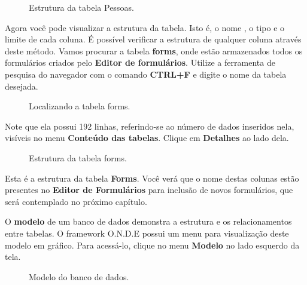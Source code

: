 \documentclass[9pt]{report}
\begin{document}
{    \begin{figure}[H]
     \caption{Estrutura da tabela Pessoas.}
     \label{fig:estruturapessoas}     
    \end{figure}
    
    Agora você pode visualizar a estrutura da tabela. Isto é, o nome
    , o tipo e o limite de cada coluna. É possível verificar a
    estrutura de qualquer coluna através deste método. Vamos procurar
    a tabela  \textbf{forms}, onde estão armazenados todos os
    formulários criados pelo  \textbf{Editor de formulários}. Utilize
    a ferramenta de pesquisa do navegador com o comando
    \textbf{CTRL+F} e digite o nome da tabela desejada.

     \begin{figure}[H]
     \label{fig:festruturaforms}
     \caption{Localizando a tabela forms.}
    \end{figure}

     Note que ela possui 192 linhas, referindo-se ao número de dados
     inseridos nela, visíveis no menu \textbf{Conteúdo das tabelas}.
     Clique em \textbf{Detalhes} ao lado dela.

     \begin{figure}[H]
     \caption{Estrutura da tabela forms.}
     \label{fig:estruturaforms}
     \end{figure}
     
     Esta é a estrutura da tabela \textbf{Forms}. Você verá que o
     nome destas colunas estão presentes no \textbf{Editor de
       Formulários} para inclusão de novos formulários, que será
     contemplado no próximo capítulo.

     O \textbf{modelo} de um banco de dados demonstra a estrutura e
     os relacionamentos entre tabelas. O framework O.N.D.E possui um
     menu para visualização deste modelo em gráfico. Para acessá-lo,
     clique no menu \textbf{Modelo} no lado esquerdo da tela.

      \begin{figure}[H]
     \caption{Modelo do banco de dados.}
     \label{fig.modelo}
     \end{figure}

}
\end{document}
